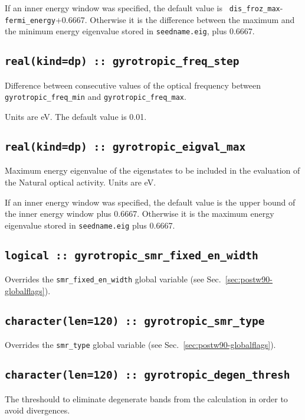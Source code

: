 If an inner energy window was specified, the default value is {\tt
  dis\_froz\_max}-{\tt fermi\_energy}+0.6667.  Otherwise it is the
difference between the maximum and the minimum energy eigenvalue
stored in {\tt seedname.eig}, plus 0.6667.

\subsection[gyrotropic\_freq\_step]{\tt real(kind=dp) :: gyrotropic\_freq\_step}
Difference between consecutive values of the optical frequency
between {\tt gyrotropic\_freq\_min} and {\tt gyrotropic\_freq\_max}. 

Units are eV.
The default value is 0.01.

\subsection[gyrotropic\_eigval\_max]{\tt real(kind=dp) ::  gyrotropic\_eigval\_max}
Maximum energy eigenvalue of the eigenstates to be included in the
evaluation of the Natural optical activity.   Units are eV.

If an inner energy window was specified, the default value is the
upper bound of the inner energy window plus 0.6667.  Otherwise it is
the maximum energy eigenvalue stored in {\tt seedname.eig} plus
0.6667.

\subsection[gyrotropic\_smr\_fixed\_en\_width]{\tt logical :: gyrotropic\_smr\_fixed\_en\_width}
Overrides the \verb#smr_fixed_en_width# global variable (see
Sec.~\ref{sec:postw90-globalflags}).

\subsection[gyrotropic\_smr\_type]{\tt  character(len=120) :: gyrotropic\_smr\_type}
Overrides the \verb#smr_type# global variable (see
Sec.~\ref{sec:postw90-globalflags}).

\subsection[gyrotropic\_degen\_thresh]{\tt  character(len=120) :: gyrotropic\_degen\_thresh}
The threshould to eliminate degenerate bands from the calculation
in order to avoid divergences.

